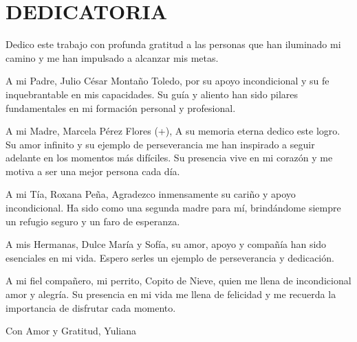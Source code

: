\clearpage
{} 
    \setcounter{page}{1}
\thispagestyle{plain}
\section*{\centering DEDICATORIA}
\justify %

Dedico este trabajo con profunda gratitud a las personas que han iluminado mi camino y me han impulsado a alcanzar mis metas. \newline

A mi Padre, Julio César Montaño Toledo, por su apoyo incondicional y su fe inquebrantable en mis capacidades. Su guía y aliento han sido pilares fundamentales en mi formación personal y profesional. \newline

A mi Madre, Marcela Pérez Flores (+), A su memoria eterna dedico este logro. Su amor infinito y su ejemplo de perseverancia me han inspirado a seguir adelante en los momentos más difíciles. Su presencia vive en mi corazón y me motiva a ser una mejor persona cada día. \newline

A mi Tía, Roxana Peña, Agradezco inmensamente su cariño y apoyo incondicional. Ha sido como una segunda madre para mí, brindándome siempre un refugio seguro y un faro de esperanza. \newline

A mis Hermanas, Dulce María y Sofía, su amor, apoyo y compañía han sido esenciales en mi vida. Espero serles un ejemplo de perseverancia y dedicación. \newline

A mi fiel compañero, mi perrito, Copito de Nieve, quien me llena de incondicional amor y alegría. Su presencia en mi vida me llena de felicidad y me recuerda la importancia de disfrutar cada momento. \newline

Con Amor y Gratitud, \newline
Yuliana